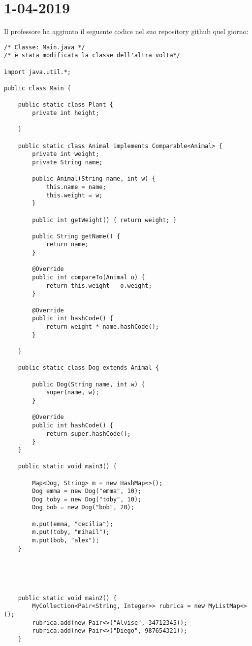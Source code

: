 

\newpage
\section{1-04-2019}
\noindent Il professore ha aggiunto il seguente codice nel suo repository github quel giorno: 

\begin{lstlisting}[basicstyle=\small,]
/* Classe: Main.java */
/* è stata modificata la classe dell'altra volta*/

import java.util.*;

public class Main {

    public static class Plant {
        private int height;

    }

    public static class Animal implements Comparable<Animal> {
        private int weight;
        private String name;

        public Animal(String name, int w) {
            this.name = name;
            this.weight = w;
        }

        public int getWeight() { return weight; }

        public String getName() {
            return name;
        }

        @Override
        public int compareTo(Animal o) {
            return this.weight - o.weight;
        }

        @Override
        public int hashCode() {
            return weight * name.hashCode();
        }

    }

    public static class Dog extends Animal {

        public Dog(String name, int w) {
            super(name, w);
        }

        @Override
        public int hashCode() {
            return super.hashCode();
        }
    }

    public static void main3() {

        Map<Dog, String> m = new HashMap<>();
        Dog emma = new Dog("emma", 10);
        Dog toby = new Dog("toby", 10);
        Dog bob = new Dog("bob", 20);

        m.put(emma, "cecilia");
        m.put(toby, "mihail");
        m.put(bob, "alex");
    }





    public static void main2() {
        MyCollection<Pair<String, Integer>> rubrica = new MyListMap<>();
        rubrica.add(new Pair<>("Alvise", 34712345));
        rubrica.add(new Pair<>("Diego", 987654321));
    }



\end{lstlisting}
